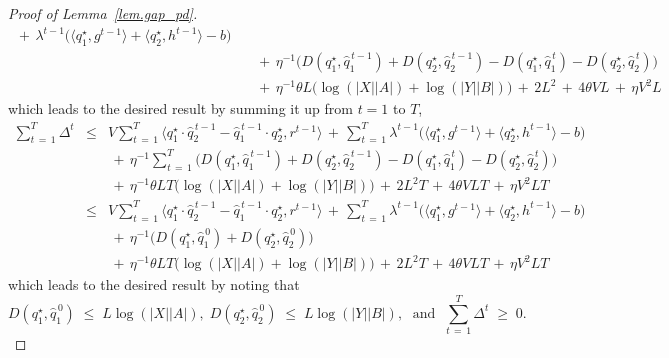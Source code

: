 \documentclass[12pt, final]{l4dc2023}
\begin{document}
\begin{proof}[Proof of Lemma~\ref{lem.gap_pd}]
\[\begin{array}{rcl}
	\,+\,
	\lambda^{t-1} \big(\langle{ q_1^\star},{g^{t-1}}\rangle 
	+ \langle{ q_2^\star},{h^{t-1}}\rangle -b\big)
	\\[0.2cm]
	&& \,+\, \eta^{-1} \big(D( q_1^\star,\hat q_1^{\,t-1}) + D( q_2^\star, \hat q_2^{\,t-1}) -D( q_1^\star,\hat q_1^{\,t}) - D( q_2^\star, \hat q_2^{\,t}) \big)
	\\[0.2cm]
	&& \,+\, \eta^{-1}\theta L \big(\log (|X||A|) +\log (|Y||B|)\big)\,+\,2L^2 \,+\,4\theta V L\,+\,\eta V^2 L
	\end{array}
	\]
	which leads to the desired result by summing it up from $t=1$ to $T$,
	\[
	\begin{array}{rcl}
	\displaystyle
	\sum_{t\,=\,1}^{T}\Delta^{t} 
	&\leq& \displaystyle V\sum_{t\,=\,1}^{T} \big\langle{ q_1^\star\cdot \hat q_2^{\,t-1}-\hat q_1^{\,t-1}\cdot  q_2^\star },{r^{t-1}}\big\rangle 
	\,+\,\sum_{t\,=\,1}^{T}
	\lambda^{t-1} \big(\langle{ q_1^\star},{g^{t-1}}\rangle 
	+ \langle{ q_2^\star},{h^{t-1}}\rangle -b\big)
	\\[0.2cm]
	&& \displaystyle\,+\, \eta^{-1} \sum_{t\,=\,1}^{T}\big(D( q_1^\star,\hat q_1^{\,t-1}) + D( q_2^\star, \hat q_2^{\,t-1}) -D( q_1^\star,\hat q_1^{\,t}) - D( q_2^\star, \hat q_2^{\,t}) \big)
	\\[0.2cm]
	&&\displaystyle \,+\, \eta^{-1}\theta L T\big(\log (|X||A|) +\log (|Y||B|)\big)\,+\,2L^2 T\,+\,4\theta V LT\,+\,\eta V^2 LT
	\\[0.2cm]
	&\leq& \displaystyle V\sum_{t\,=\,1}^{T} \big\langle{ q_1^\star\cdot \hat q_2^{\,t-1}-\hat q_1^{\,t-1}\cdot  q_2^\star },{r^{t-1}}\big\rangle 
	\,+\,\sum_{t\,=\,1}^{T}
	\lambda^{t-1} \big(\langle{ q_1^\star},{g^{t-1}}\rangle 
	+ \langle{ q_2^\star},{h^{t-1}}\rangle -b\big)
	\\[0.2cm]
	&& \displaystyle\,+\, \eta^{-1} \big(D( q_1^\star,\hat q_1^{\,0}) + D( q_2^\star, \hat q_2^{\,0}) \big)
	\\[0.2cm]
	&&\displaystyle \,+\, \eta^{-1}\theta L T\big(\log (|X||A|) +\log (|Y||B|)\big)\,+\,2L^2 T\,+\,4\theta V LT\,+\,\eta V^2 LT
	\end{array}
	\]
	which leads to the desired result by noting that 
	\[
	D( q_1^\star,\hat q_1^{\,0})\;\leq\; L\log(|X||A|), \; D( q_2^\star, \hat q_2^{\,0}) \;\leq\; L\log(|Y||B|), \; \text{ and } \; \sum_{t\,=\,1}^{T}\Delta^{t} \; \geq \; 0. 
	\]
\end{proof}


\end{document}
